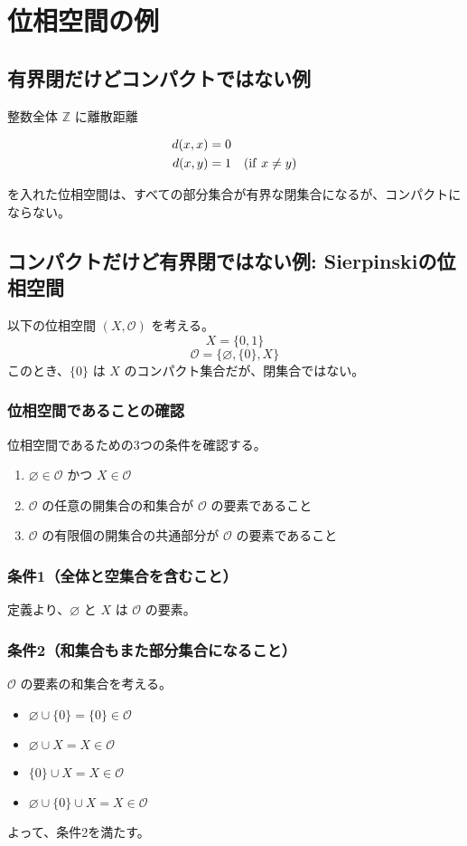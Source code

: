 \documentclass[uplatex,a4j,12pt,dvipdfmx]{jsarticle}
\begin{document}
\section{位相空間の例}

\subsection{有界閉だけどコンパクトではない例}

整数全体 $\mathbb{Z}$ に離散距離

\begin{align*}
	d(x, x) & = 0                             \\
	d(x, y) & = 1 \ \ \ ({\rm if} \ x \neq y)
\end{align*}

を入れた位相空間は、すべての部分集合が有界な閉集合になるが、コンパクトにならない。


\subsection{コンパクトだけど有界閉ではない例: Sierpinskiの位相空間}

以下の位相空間 $(X, \mathcal{O})$ を考える。
$$X = \{0, 1\}$$
$$\mathcal{O} = \{\varnothing, \{0\}, X\}$$
このとき、$\{0\}$ は $X$ のコンパクト集合だが、閉集合ではない。

\subsubsection{位相空間であることの確認}

位相空間であるための3つの条件を確認する。
\begin{enumerate}
	\item $\varnothing \in \mathcal{O}$ かつ $X \in \mathcal{O}$
	\item $\mathcal{O}$ の任意の開集合の和集合が $\mathcal{O}$ の要素であること
	\item $\mathcal{O}$ の有限個の開集合の共通部分が $\mathcal{O}$ の要素であること
\end{enumerate}

\subsubsection{条件1（全体と空集合を含むこと）}
定義より、$\varnothing$ と $X$ は $\mathcal{O}$ の要素。

\subsubsection{条件2（和集合もまた部分集合になること）}
$\mathcal{O}$ の要素の和集合を考える。
\begin{itemize}
	\item $\varnothing \cup \{0\} = \{0\} \in \mathcal{O}$
	\item $\varnothing \cup X = X \in \mathcal{O}$
	\item $\{0\} \cup X = X \in \mathcal{O}$
	\item $\varnothing \cup \{0\} \cup X = X \in \mathcal{O}$
\end{itemize}
よって、条件2を満たす。
\end{document}
